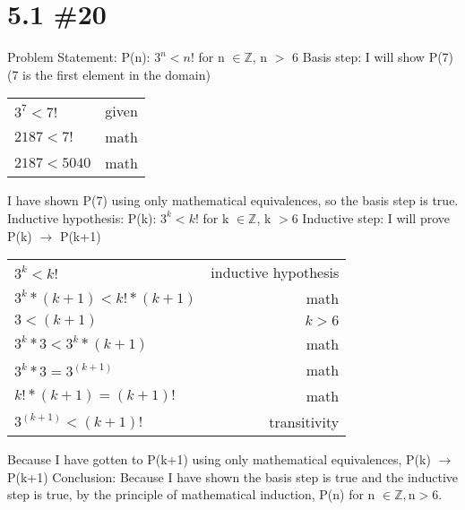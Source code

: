 \documentclass[h]{article}
\begin{document}
\section*{5.1 \#20}
Problem Statement:\newline
P(n): $3^n < n!$ for n $\in \mathbb{Z}$, n $>$ 6\newline
Basis step:\newline
I will show P(7) (7 is the first element in the domain)\newline
\begin{tabular}{l|r}
$3^7 < 7!$ & given \\
$2187 < 7!$ & math\\
$2187 < 5040$ & math\\
\end{tabular}\newline
I have shown P(7) using only mathematical equivalences, so the basis step is true.\newline
Inductive hypothesis:\newline
P(k): $3^k < k!$ for k $\in \mathbb{Z}$, k $>6$ \newline
Inductive step:\newline
I will prove P(k) $\rightarrow$ P(k+1)\newline
\begin{tabular}{l|r}
$3^k < k!$ & inductive hypothesis\\
$3^k*(k+1) < k!*(k+1)$ & math\\
$3 < (k+1)$ & $k>6$\\
$3^k*3 < 3^k*(k+1) $& math\\
$3^k*3 = 3^(k+1)$ & math\\
$k! * (k+1) = (k+1)!$ & math\\
$3^(k+1) < (k+1)! $&transitivity\\
\end{tabular}
\newline
Because I have gotten to P(k+1) using only mathematical equivalences, P(k) $\rightarrow$ P(k+1)\newline
Conclusion:\newline
Because I have shown the basis step is true and the inductive step is true, by the principle of mathematical induction, P(n) for n $\in \mathbb{Z}, $n$>6$.
\end{document}

